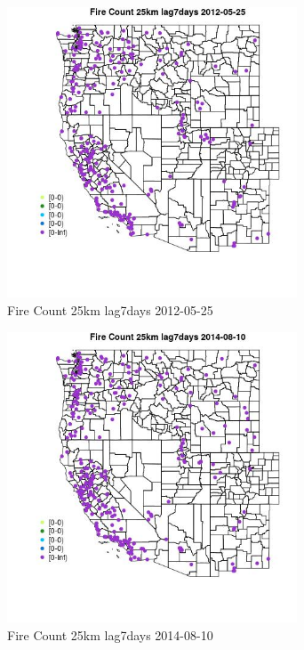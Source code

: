 \begin{figure} 
\centering  
\includegraphics[width=0.77\textwidth]{Code_Outputs/Report_ML_input_PM25_Step4_part_e_de_duplicated_aves_compiled_2019-05-18wNAs_MapObsFire_Count_25km_lag7days2012-05-25.jpg} 
\caption{\label{fig:Report_ML_input_PM25_Step4_part_e_de_duplicated_aves_compiled_2019-05-18wNAsMapObsFire_Count_25km_lag7days2012-05-25}Fire Count 25km lag7days 2012-05-25} 
\end{figure} 
 

\begin{figure} 
\centering  
\includegraphics[width=0.77\textwidth]{Code_Outputs/Report_ML_input_PM25_Step4_part_e_de_duplicated_aves_compiled_2019-05-18wNAs_MapObsFire_Count_25km_lag7days2014-08-10.jpg} 
\caption{\label{fig:Report_ML_input_PM25_Step4_part_e_de_duplicated_aves_compiled_2019-05-18wNAsMapObsFire_Count_25km_lag7days2014-08-10}Fire Count 25km lag7days 2014-08-10} 
\end{figure} 
 

